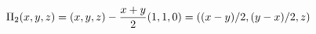\documentclass[preview]{standalone}
\begin{document}
\begin{align*}
\special{dvisvgm:raw <g id='unique000'>}\Pi_2(x,y,z)=(x,y,z)-\frac{x+y}{2}(1,1,0)=((x-y)/2,(y-x)/2,z)\special{dvisvgm:raw </g>}
\end{align*}
\end{document}
